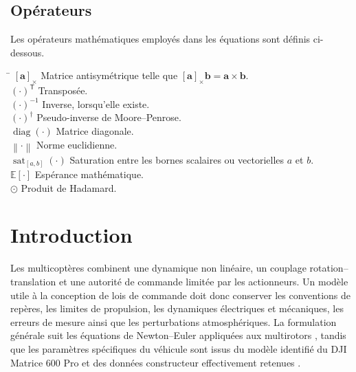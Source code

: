 \documentclass[11pt,a4paper,oneside]{report}
\newcommand{\vect}[1]{\bm{#1}}
\newcommand{\trans}{^{\mathsf T}}
\newcommand{\diag}{\operatorname{diag}}
\newcommand{\sat}{\operatorname{sat}}
\newcommand{\E}{\mathbb{E}}
\newcommand{\norm}[1]{\left\lVert#1\right\rVert}
\newcommand{\crossmat}[1]{\left[#1\right]_{\times}}
\newcommand{\had}{\odot}
\begin{document}
	\section*{Opérateurs}
	Les opérateurs mathématiques employés dans les équations sont définis ci-dessous.
	
	\vspace{3mm}
	\begin{tabbing}
		\hspace{4cm} \= \kill
		$\crossmat{\vect a}$ \> Matrice antisymétrique telle que $\crossmat{\vect a}\vect b=\vect a\times\vect b$.\\
		$(\cdot)\trans$ \> Transposée.\\
		$(\cdot)^{-1}$ \> Inverse, lorsqu'elle existe.\\
		$(\cdot)^{\dagger}$ \> Pseudo-inverse de Moore--Penrose.\\
		$\diag(\cdot)$ \> Matrice diagonale.\\
		$\norm{\cdot}$ \> Norme euclidienne.\\
		$\sat_{[a,b]}(\cdot)$ \> Saturation entre les bornes scalaires ou vectorielles $a$ et $b$.\\
		$\E[\cdot]$ \> Espérance mathématique.\\
		$\had$ \> Produit de Hadamard.\\
	\end{tabbing}
	
	\clearpage
	
	\chapter{Introduction}
	\label{chap_introduction}
	
	Les multicoptères combinent une dynamique non linéaire, un couplage rotation--translation et une autorité de commande limitée par les actionneurs. Un modèle utile à la conception de lois de commande doit donc conserver les conventions de repères, les limites de propulsion, les dynamiques électriques et mécaniques, les erreurs de mesure ainsi que les perturbations atmosphériques. La formulation générale suit les équations de Newton--Euler appliquées aux multirotors \cite{Mahony2012,Quan2017}, tandis que les paramètres spécifiques du véhicule sont issus du modèle identifié du DJI Matrice 600 Pro et des données constructeur effectivement retenues \cite{BauerNagy2024,DJI_M600_2018}.
	
\end{document}
